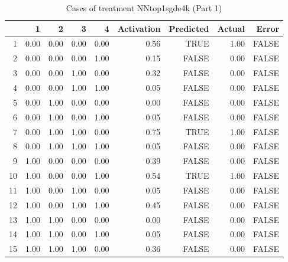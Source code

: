\begin{table}[ht]
\centering
\begin{tabular}{rrrrrrrrr}
  \hline
 & 1 & 2 & 3 & 4 & Activation & Predicted & Actual & Error \\ 
  \hline
1 & 0.00 & 0.00 & 0.00 & 0.00 & 0.56 & TRUE & 1.00 & FALSE \\ 
  2 & 0.00 & 0.00 & 0.00 & 1.00 & 0.15 & FALSE & 0.00 & FALSE \\ 
  3 & 0.00 & 0.00 & 1.00 & 0.00 & 0.32 & FALSE & 0.00 & FALSE \\ 
  4 & 0.00 & 0.00 & 1.00 & 1.00 & 0.05 & FALSE & 0.00 & FALSE \\ 
  5 & 0.00 & 1.00 & 0.00 & 0.00 & 0.00 & FALSE & 0.00 & FALSE \\ 
  6 & 0.00 & 1.00 & 0.00 & 1.00 & 0.05 & FALSE & 0.00 & FALSE \\ 
  7 & 0.00 & 1.00 & 1.00 & 0.00 & 0.75 & TRUE & 1.00 & FALSE \\ 
  8 & 0.00 & 1.00 & 1.00 & 1.00 & 0.05 & FALSE & 0.00 & FALSE \\ 
  9 & 1.00 & 0.00 & 0.00 & 0.00 & 0.39 & FALSE & 0.00 & FALSE \\ 
  10 & 1.00 & 0.00 & 0.00 & 1.00 & 0.54 & TRUE & 1.00 & FALSE \\ 
  11 & 1.00 & 0.00 & 1.00 & 0.00 & 0.05 & FALSE & 0.00 & FALSE \\ 
  12 & 1.00 & 0.00 & 1.00 & 1.00 & 0.45 & FALSE & 0.00 & FALSE \\ 
  13 & 1.00 & 1.00 & 0.00 & 0.00 & 0.00 & FALSE & 0.00 & FALSE \\ 
  14 & 1.00 & 1.00 & 0.00 & 1.00 & 0.05 & FALSE & 0.00 & FALSE \\ 
  15 & 1.00 & 1.00 & 1.00 & 0.00 & 0.36 & FALSE & 0.00 & FALSE \\ 
   \hline
\end{tabular}
\caption{Cases of treatment NNtop1sgde4k (Part 1)} 
\end{table}
